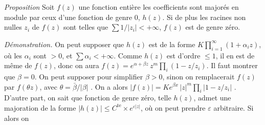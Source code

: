 \documentclass[11pt,a4paper]{article}
\begin{document}
\emph{Proposition} Soit $f(z)$ une fonction entière   les coefficients sont majorés en module par ceux d'une fonction de genre $0$, $h(z)$. Si de plus les racines non nulles $z_i$ de $f(z)$ sont telles que $\sum 1/|z_i| < +\infty$, $f(z)$ est de genre zéro.


 \emph{Démonstration.} On peut supposer que $h(z)$ est de la forme $K \prod_{i=1}^{\infty} (1 + \alpha_i z)$, où les $\alpha_i$ sont $> 0$, et $\sum \alpha_i < +\infty$. Comme $h(z)$ est d'ordre $\leq 1$, il en est de même de $f(z)$, donc on aura $f(z) = e^{\alpha + \beta z}\, z^m \prod_i (1 - z/z_i)$. Il faut montrer que $\beta = 0$. On peut supposer pour simplifier $\beta > 0$, sinon on remplacerait $f(z)$ par $f(\theta z)$, avec $\theta = \bar{\beta}/|\beta|$ . On a alors $|f(z)| = K e^{\beta x}\, |z|^m \prod_i |1 - z/z_i|$ . D'autre part, on sait que \struck{\ill{}}  fonction de genre zéro, telle $h(z)$, admet une majoration de la forme $|h(z)| \leq C^{\mathrm{te}} \times e^{\varepsilon|z|}$, où on peut prendre $\varepsilon$ arbitraire. Si alors on  
\end{document}
